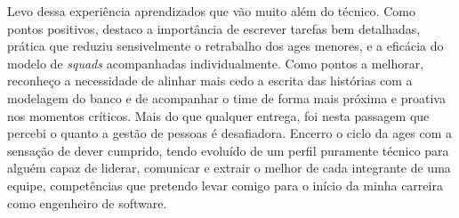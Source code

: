 Levo dessa experiência aprendizados que vão muito além do técnico. Como pontos positivos, destaco a importância de escrever tarefas bem detalhadas, prática que reduziu sensivelmente o retrabalho dos \ac{ages} menores, e a eficácia do modelo de \textit{squads} acompanhadas individualmente. Como pontos a melhorar, reconheço a necessidade de alinhar mais cedo a escrita das histórias com a modelagem do banco e de acompanhar o time de forma mais próxima e proativa nos momentos críticos. Mais do que qualquer entrega, foi nesta passagem que percebi o quanto a gestão de pessoas é desafiadora. Encerro o ciclo da \ac{ages} com a sensação de dever cumprido, tendo evoluído de um perfil puramente técnico para alguém capaz de liderar, comunicar e extrair o melhor de cada integrante de uma equipe, competências que pretendo levar comigo para o início da minha carreira como engenheiro de software.

